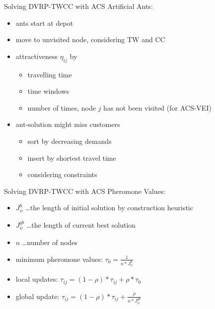 \begin{frame}{Solving DVRP-TWCC with ACS}
  Artificial Ants:
  \begin{itemize}
    \item ants start at depot
    \item move to unvisited node, considering TW and CC
    \item attractiveness $\eta_{ij}$ by
      \begin{itemize}
        \item travelling time
	\item time windows
	\item number of times, node $j$ has not been visited (for ACS-VEI)
      \end{itemize}
    \item ant-solution might miss customers
      \begin{itemize}
        \item sort by decreasing demands
	\item insert by shortest travel time
	\item considering constraints
      \end{itemize}
  \end{itemize}
\end{frame}

\begin{frame}{Solving DVRP-TWCC with ACS}
  Pheromone Values:
  \begin{itemize}
    \item $J^h_{\psi}$ \dots the length of initial solution by construction heuristic
    \item $J^{gb}_{\psi}$ \dots the length of current best solution
    \item $n$ \dots number of nodes
    \item minimum pheromone values: $\tau_0 = \frac{1}{n*J^h_{\psi}}$
    \item local updates: $\tau_{ij} = (1-\rho)*\tau_{ij} + \rho*\tau_0$\\
    \item global update: $\tau_{ij} = (1-\rho)*\tau_{ij} + \frac{\rho}{n*J^{gb}_{\psi}}$\\	  
  \end{itemize}
\end{frame}

